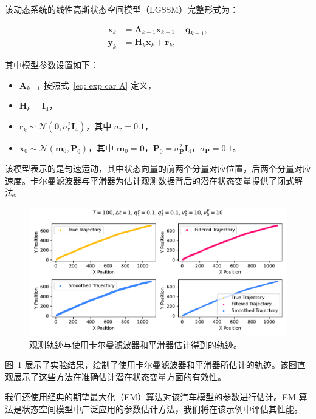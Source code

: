 该动态系统的线性高斯状态空间模型（LGSSM）完整形式为：

\begin{align*}
    \mathbf{x}_k &= \mathbf{A}_{k-1} \mathbf{x}_{k-1} + \mathbf{q}_{k-1}, \\
    \mathbf{y}_k &= \mathbf{H}_k \mathbf{x}_{k} + \mathbf{r}_{k},
\end{align*}

其中模型参数设置如下：
\begin{itemize}
    \item \(\mathbf{A}_{k-1}\) 按照式~\eqref{eq: exp car A} 定义，
    \item \(\mathbf{H}_k = \mathbf{I}_4\)，
    \item \(\mathbf{r}_k \sim \mathcal{N}(\mathbf{0}, \sigma_\mathbf{r}^2 \mathbf{I}_4)\)，其中 \(\sigma_\mathbf{r} = 0.1\)，
    \item \(\mathbf{x}_0 \sim \mathcal{N}(\mathbf{m}_0, \mathbf{P}_0)\)，其中 \(\mathbf{m}_0 = \mathbf{0}\)，\(\mathbf{P}_0 = \sigma_\mathbf{P}^2 \mathbf{I}_4\)，\(\sigma_\mathbf{P} = 0.1\)。
\end{itemize}

该模型表示的是匀速运动，其中状态向量的前两个分量对应位置，后两个分量对应速度。卡尔曼滤波器与平滑器为估计观测数据背后的潜在状态变量提供了闭式解法。

\begin{figure}
    \centering
    \includegraphics[width=0.95\linewidth]{fig/estimated_car_trajectory.pdf}
    \caption{观测轨迹与使用卡尔曼滤波器和平滑器估计得到的轨迹。}
    \label{fig: exp car trajectory}
\end{figure}

图~\ref{fig: exp car trajectory} 展示了实验结果，绘制了使用卡尔曼滤波器和平滑器所估计的轨迹。该图直观展示了这些方法在准确估计潜在状态变量方面的有效性。

我们还使用经典的期望最大化（EM）算法对该汽车模型的参数进行估计。EM 算法是状态空间模型中广泛应用的参数估计方法，我们将在该示例中评估其性能。

